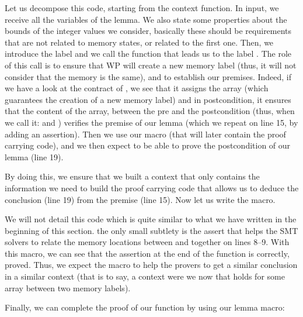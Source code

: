 Let us decompose this code, starting from the context function. In input, we
receive all the variables of the lemma. We also state some properties about the
bounds of the integer values we consider, basically these should be requirements
that are not related to memory states, or related to the first one. Then, we
introduce the label
 and we call the function  that leads
us to the label . The role of this call is to ensure that WP will
create a new memory label (thus, it will not consider that the memory is the
same), and to establish our premises. Indeed, if we have a look at the contract
of , we see that it assigns the array (which
guarantees the creation of a new memory label) and in postcondition, it ensures
that the content of the array, between the pre and the postcondition (thus, when
we call it:  and ) verifies the premise of our
lemma (which we repeat on line 15, by adding an assertion). Then we use our
 macro (that will later contain the proof carrying code),
and we then expect to be able to prove the postcondition of our lemma (line 19).



By doing this, we ensure that we built a context that only contains the
information we need to build the proof carrying code that allows us to deduce
the conclusion (line 19) from the premise (line 15). Now let us write the macro.






We will not detail this code which is quite similar to what we have written in
the beginning of this section. the only small subtlety is the assert that helps
the SMT solvers to relate the memory locations between  and
 together on lines 8--9. With this macro, we can see that the
assertion at the end of the function 
is correctly, proved. Thus, we expect the macro to help the provers to get a
similar conclusion in a similar context (that is to say, a context were we now
that  holds for some array between two memory labels).


Finally, we can complete the proof of our function  by using
our lemma macro:






